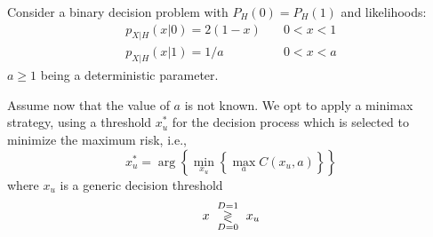 \else

\question Consider a binary decision problem with $P_H(0) = P_H(1)$ and likelihoods:
 $$\begin{array}{ll}
 p_{X|H}(x|0)=2 \left(1-x \right) & \quad 0<x<1 \\
  p_{X|H}(x|1)=1/a & \quad 0<x<a
 \end{array}$$
$a\geq1$ being a deterministic parameter.
Assume now that the value of $a$ is not known. We opt to apply a minimax strategy, using a threshold $x_u^*$ for the decision process which is selected to minimize the maximum risk, i.e., 
 $$x_u^*=\arg \left\lbrace \min_{x_u}  \left\lbrace \max_a C(x_u,a)   \right\rbrace   \right\rbrace  $$
where $x_u$ is a generic decision threshold
		 $$x \,\, \underset{D=0}{\overset{D=1}{\gtrless}}\,\, x_u$$

\begin{solution}
\end{solution}

\fi
